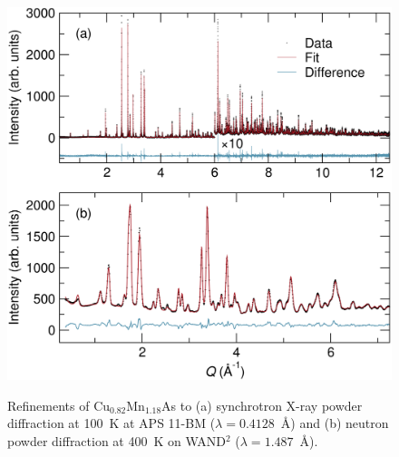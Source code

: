 \documentclass[letterpaper,10pt,doublespacing,edeposit]{uiucthesis2020}
\begin{document}
\begin{mainmatter}
\begin{figure}
\centering\includegraphics[width=0.7\columnwidth]{figures/ch5/h-cumnas_11bm_100k_wand_400k_combine} \\
\caption{
Refinements of Cu$_{0.82}$Mn$_{1.18}$As to (a) synchrotron X-ray powder diffraction at 100~K at APS 11-BM ($\lambda = 0.4128$~\AA) and (b) neutron powder diffraction at 400~K on WAND$^2$ ($\lambda = 1.487$~\AA).
}
\label{fig:xrd-neutron}
\end{figure}

\end{mainmatter}
\end{document}
